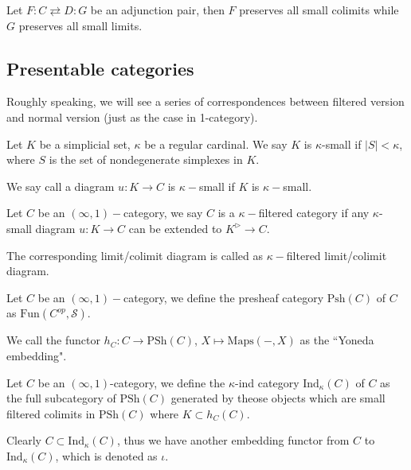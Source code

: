 \begin{proposition}
    Let $F:C\rightleftarrows D:G$ be an adjunction pair, then $F$ preserves all small colimits while $G$ preserves all small limits.
\end{proposition}


\subsection{Presentable categories}

Roughly speaking, we will see a series of  correspondences between filtered version and normal version (just as the case in 1-category).

\begin{definition}
    Let $K$ be a simplicial set, $\kappa$ be a regular cardinal. We say $K$ is $\kappa$-small if $|S|<\kappa$, where $S$ is the set of nondegenerate simplexes in $K$.

    We say call a diagram $u:K\to C$ is $\kappa-$small if $K$ is $\kappa-$small.
\end{definition}

\begin{definition}
    Let $C$ be an $(\infty,1)-$category, we say $C$ is a $\kappa-$filtered category if any $\kappa$-small diagram $u:K\to C$ can be extended to $K^{\triangleright}\to C$.

    The corresponding limit/colimit diagram is called as $\kappa-$filtered limit/colimit diagram.
\end{definition}

\begin{definition}
    Let $C$ be an $(\infty,1)-$category, we define the presheaf category $\text{Psh}(C)$ of $C$ as $\text{Fun}(C^{op},\mathscr{S})$.

    We call the functor $h_C:C\to \text{PSh}(C)$, $X\mapsto \text{Maps}(-,X)$ as the ``Yoneda embedding".
\end{definition}

\begin{definition}
    Let $C$ be an $(\infty,1)$-category, we define the $\kappa$-ind category $\text{Ind}_\kappa(C)$ of $C$ as the full subcategory of $\text{PSh}(C)$ generated by theose objects which are small filtered colimits in $\text{PSh}(C)$ where $K\subset h_C(C)$.
\end{definition}

\begin{remark}
    Clearly $C\subset \text{Ind}_\kappa(C)$, thus we have another embedding functor from $C$ to $\text{Ind}_\kappa(C)$, which is denoted as $\iota$.
\end{remark}

